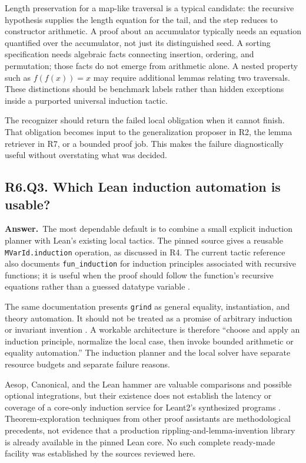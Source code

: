 \documentclass[11pt,a4paper]{article}
\theoremstyle{definition}
\theoremstyle{remark}
\newcommand{\code}[1]{\texttt{#1}}
\newcommand{\answer}{\par\noindent\textbf{Answer.}\ }
\newcommand{\qheading}[2]{\subsection{#1. #2}}
\begin{document}
Length preservation for a map-like traversal is a typical candidate: the
recursive hypothesis supplies the length equation for the tail, and the step
reduces to constructor arithmetic. A proof about an accumulator typically needs
an equation quantified over the accumulator, not just its distinguished seed.
A sorting specification needs algebraic facts connecting insertion, ordering,
and permutation; those facts do not emerge from arithmetic alone. A nested
property such as $f(f(x))=x$ may require additional lemmas relating two traversals.
These distinctions should be benchmark labels rather than hidden exceptions
inside a purported universal induction tactic.

The recognizer should return the failed local obligation when it cannot finish.
That obligation becomes input to the generalization proposer in R2, the lemma
retriever in R7, or a bounded proof job. This makes the failure diagnostically
useful without overstating what was decided.

\qheading{R6.Q3}{Which Lean induction automation is usable?}
\answer The most dependable default is to combine a small explicit induction
planner with Lean's existing local tactics. The pinned source gives a reusable
\code{MVarId.induction} operation, as discussed in R4. The current tactic
reference also documents \code{fun\_induction} for induction principles
associated with recursive functions; it is useful when the proof should follow
the function's recursive equations rather than a guessed datatype variable
\cite{leanind,leantactics}.

The same documentation presents \code{grind} as general equality, instantiation,
and theory automation. It should not be treated as a promise of arbitrary
induction or invariant invention \cite{leantactics}. A workable architecture
is therefore ``choose and apply an induction principle, normalize the local
case, then invoke bounded arithmetic or equality automation.'' The induction
planner and the local solver have separate resource budgets and separate
failure reasons.

Aesop, Canonical, and the Lean hammer are valuable comparisons and possible
optional integrations, but their existence does not establish the latency or
coverage of a core-only induction service for Leant2's synthesized programs
\cite{aesop,canonical,hammer}. Theorem-exploration techniques from other proof
assistants are methodological precedents, not evidence that a production
rippling-and-lemma-invention library is already available in the pinned Lean
core. No such complete ready-made facility was established by the sources
reviewed here.
\end{document}
